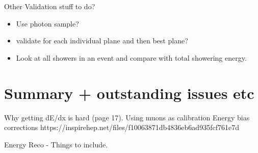 \newpage
Other Validation stuff to do?
\begin{itemize}
    \item Use photon sample?
    \item validate for each individual plane and then best plane?
    \item Look at all showers in an event and compare with total showering energy. 
\end{itemize}


\section{Summary + outstanding issues etc}

Why getting dE/dx is hard (page 17).
Using muons as calibration
Energy bias corrections
https://inspirehep.net/files/f10063871db4836eb6ad935fcf761e7d

Energy Reco - Things to include.

